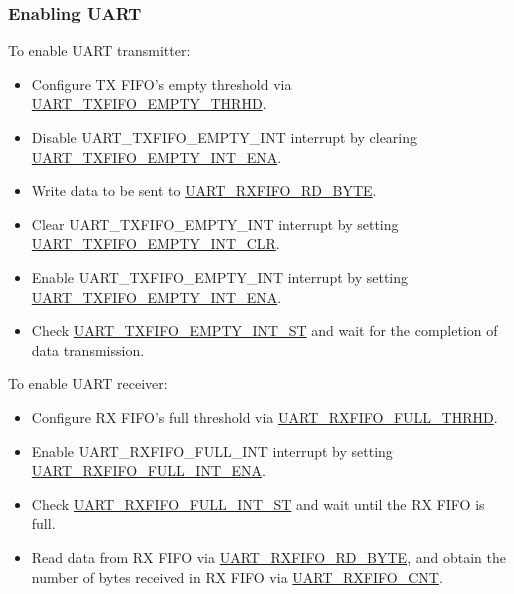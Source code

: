 \documentclass[main\_\_EN.tex]{subfiles}
\begin{document}
\subsubsection{Enabling UART}

To enable UART transmitter:

\begin{itemize}
    \item Configure TX FIFO's empty threshold via \hyperref[fielddesc:UARTTXFIFOEMPTYTHRHD]{UART\_TXFIFO\_EMPTY\_THRHD}.
    \item Disable UART\_TXFIFO\_EMPTY\_INT interrupt by clearing \hyperref[fielddesc:UARTTXFIFOEMPTYINTENA]{UART\_TXFIFO\_EMPTY\_INT\_ENA}.
    \item Write data to be sent to \hyperref[fielddesc:UARTRXFIFORDBYTE]{UART\_RXFIFO\_RD\_BYTE}.
    \item Clear UART\_TXFIFO\_EMPTY\_INT interrupt by setting  \hyperref[fielddesc:UARTTXFIFOEMPTYINTCLR]{UART\_TXFIFO\_EMPTY\_INT\_CLR}.
    \item Enable UART\_TXFIFO\_EMPTY\_INT interrupt by setting \hyperref[fielddesc:UARTTXFIFOEMPTYINTENA]{UART\_TXFIFO\_EMPTY\_INT\_ENA}.
    \item Check \hyperref[fielddesc:UARTTXFIFOEMPTYINTST]{UART\_TXFIFO\_EMPTY\_INT\_ST} and wait for the completion of data transmission.
\end{itemize}

To enable UART receiver:
\begin{itemize}
    \item Configure RX FIFO's full threshold via \hyperref[fielddesc:UARTRXFIFOFULLTHRHD]{UART\_RXFIFO\_FULL\_THRHD}.
    \item Enable UART\_RXFIFO\_FULL\_INT interrupt by setting \hyperref[fielddesc:UARTRXFIFOFULLINTENA]{UART\_RXFIFO\_FULL\_INT\_ENA}.
    \item Check \hyperref[fielddesc:UARTRXFIFOFULLINTST]{UART\_RXFIFO\_FULL\_INT\_ST} and wait until the RX FIFO is full.
    \item Read data from RX FIFO via  \hyperref[fielddesc:UARTRXFIFORDBYTE]{UART\_RXFIFO\_RD\_BYTE}, and obtain the number of bytes received in RX FIFO via \hyperref[fielddesc:UARTRXFIFOCNT]{UART\_RXFIFO\_CNT}.
\end{itemize}


\end{document}
